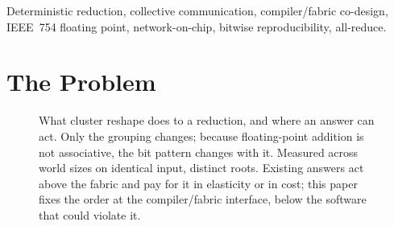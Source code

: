 \documentclass[journal,10pt]{IEEEtran}
\theoremstyle{plain}
\theoremstyle{definition}
\theoremstyle{remark}
\begin{document}
{\begin{abstract}
establish oracle non-vacuity on \MutOracleLo{}--\MutOracleHi{} of \MutTotal{}
verdicts. The compiler's search space provably cannot reach the bit result;
what it can reach is a fixed portfolio of \SelConfigsRun{} of
\SelConfigsTotal{} configurations that attains the measured optimum on
\SelKFourOpt{} of \TournNInst{} held-out instances and transfers to a withheld
topology, beating every rule we could fit that conditions on the instance.
Finally we export the discipline to production collectives in software
(\emph{pinned-FBT}), correct the natural index-range construction, and
price the repair: bitwise reshape-invariant on all \PinCells{} cells swept
against a negative control that fires, at a geometric mean of $\PinCostGeo\times$
stock \texttt{ncclAllReduce} --- provisional under GPU contention, of which
about a factor of two is algorithmic, in bytes moved.
\end{abstract}

\begin{IEEEkeywords}
Deterministic reduction, collective communication, compiler/fabric co-design,
IEEE~754 floating point, network-on-chip, bitwise reproducibility, all-reduce.
\end{IEEEkeywords}}

\maketitle
\IEEEdisplaynontitleabstractindextext
\IEEEpeerreviewmaketitle


\section{The Problem}\label{sec:intro}

\begin{figure}[!t]\centering

\caption{What cluster reshape does to a reduction, and where an answer can act. Only the grouping changes; because floating-point addition is not associative, the bit pattern changes with it. Measured across \GpuWorldSizes{} world sizes on identical input, \GpuRootsDistinct{} distinct roots. Existing answers act above the fabric and pay for it in elasticity or in cost; this paper fixes the order at the compiler/fabric interface, below the software that could violate it.}\label{fig:reshape}
\end{figure}
\end{document}
